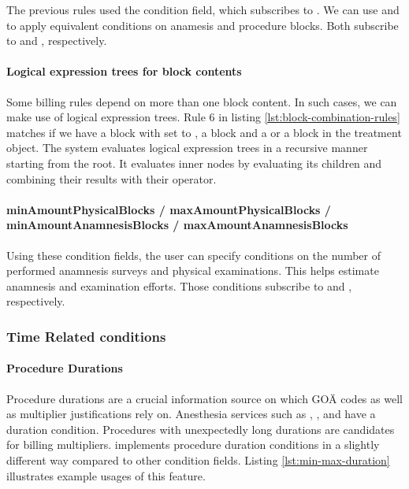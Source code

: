 The previous rules used the  condition field, which subscribes to .
We can use  and  to apply equivalent conditions on anamesis and procedure blocks.
Both subscribe to  and , respectively.

\paragraph{Logical expression trees for block contents}\label{par:logical-trees}
Some billing rules depend on more than one block content.
In such cases, we can make use of logical expression trees.
Rule 6 in listing \ref{lst:block-combination-rules} matches if we have a  block with  set to \true,
a  block and a  or a  block in the treatment object.
The system evaluates logical expression trees in a recursive manner starting from the root.
It evaluates inner nodes by evaluating its children and combining their results with their operator.


\paragraph{minAmountPhysicalBlocks / maxAmountPhysicalBlocks / minAmountAnamnesisBlocks / maxAmountAnamnesisBlocks}
Using these condition fields, the user can specify conditions on the number of performed anamnesis surveys and physical examinations.
This helps estimate anamnesis and examination efforts.
Those conditions subscribe to  and , respectively.

\subsubsection{Time Related conditions}

\paragraph{Procedure Durations}
Procedure durations are a crucial information source on which GOÄ codes as well as multiplier justifications rely on.
Anesthesia services such as , ,  and  have a duration condition.
Procedures with unexpectedly long durations are candidates for billing multipliers.
\RL implements procedure duration conditions in a slightly different way compared to other condition fields.
Listing \ref{lst:min-max-duration} illustrates example usages of this feature.

